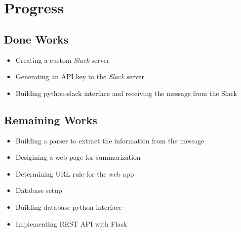 \documentclass[11pt]{article}
\begin{document}
\section{Progress}

\subsection{Done Works}
\begin{itemize}
  \item Creating a custom \textit{Slack} server
  \item Generating an API key to the \textit{Slack} server
  \item Building python-slack interface and receiving the message from the Slack
\end{itemize}

\subsection{Remaining Works}
\begin{itemize}
  \item Building a parser to extract the information from the message
  \item Desigining a web page for summarization
  \item Determining URL rule for the web app
  \item Database setup
  \item Building database-python interface
  \item Implementing REST API with Flask
\end{itemize}
\end{document}
